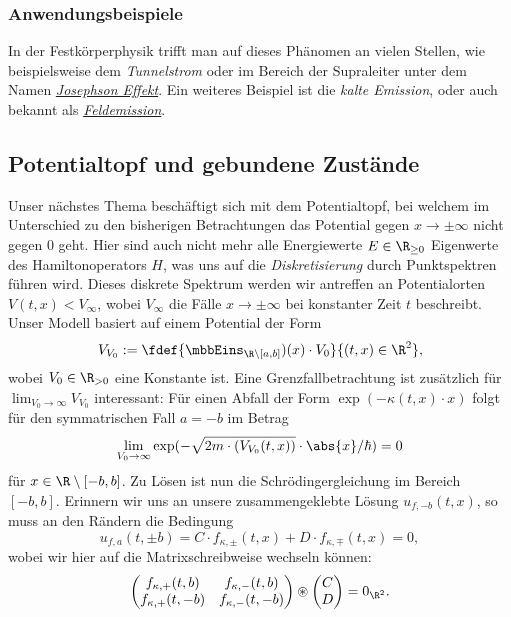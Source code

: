 \documentclass{subfiles}
\begin{document}
    \subsubsection*{Anwendungsbeispiele}
        In der Festkörperphysik trifft man auf dieses Phänomen an vielen Stellen, wie beispielsweise dem \emph{Tunnelstrom} oder im Bereich der Supraleiter unter dem Namen \href{https://de.wikipedia.org/wiki/Josephson-Effekt}{\emph{Josephson Effekt}}. Ein weiteres Beispiel ist die \emph{kalte Emission}, oder auch bekannt als \href{https://de.wikipedia.org/wiki/Feldemission}{\emph{Feldemission}}.

    \subsection{Potentialtopf und gebundene Zustände}   
        Unser nächstes Thema beschäftigt sich mit dem Potentialtopf, bei welchem im Unterschied zu den bisherigen Betrachtungen das Potential gegen $x\to\pm\infty$ nicht gegen $0$ geht. Hier sind auch nicht mehr alle Energiewerte $E\in\R_{\geq 0}$ Eigenwerte des Hamiltonoperators $H$, was uns auf die \emph{Diskretisierung} durch Punktspektren führen wird. Dieses diskrete Spektrum werden wir antreffen an Potentialorten $V(t,x)<V_\infty$, wobei $V_\infty$ die Fälle $x\to\pm\infty$ bei konstanter Zeit $t$ beschreibt. Unser Modell basiert auf einem Potential der Form
        \[V_{V_0}:=\fdef{\mbbEins_{\R\setminus[a,b]})(x)\cdot V_0}{(t,x)\in\R^2},\]
        wobei $V_0\in\R_{>0}$ eine Konstante ist. Eine Grenzfallbetrachtung ist zusätzlich für $\lim_{V_0\to\infty} V_{V_0}$ interessant: Für einen Abfall der Form $\exp(-\kappa(t,x)\cdot x)$ folgt für den symmatrischen Fall $a = -b$ im Betrag
        \[\lim_{V_0\to\infty}\exp(-\sqrt{2m\cdot(V_{V_0}(t,x))}\cdot \abs{x}/\hbar) = 0\]
        für $x\in\R\setminus{[-b,b]}$. Zu Lösen ist nun die Schrödingergleichung im Bereich $[-b,b]$. Erinnern wir uns an unsere zusammengeklebte Lösung $u_{f,-b}(t,x)$, so muss an den Rändern die Bedingung
        \[u_{f,a}(t,\pm b) = C\cdot f_{\kappa,\pm}(t,x) + D\cdot f_{\kappa,\mp}(t,x) = 0,\]
        wobei wir hier auf die Matrixschreibweise wechseln können: 
        \[\begin{pmatrix}
            f_{\kappa,+}(t,b) & f_{\kappa,-}(t,b) \\
            f_{\kappa,+}(t,-b) & f_{\kappa,-}(t,-b) 
        \end{pmatrix}\circledast \begin{pmatrix}
            C \\ D
        \end{pmatrix} = 0_{\R^2}.\]
\end{document}
